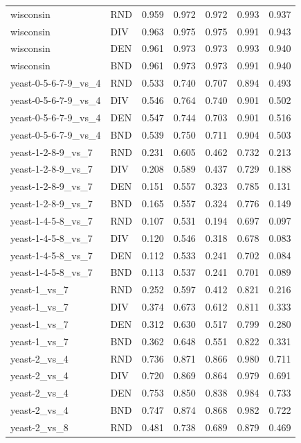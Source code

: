 \documentclass[10pt,a4paper]{article}
\begin{document}
\begin{longtable}{lllllrr}
wisconsin & RND & 0.959 & 0.972 & 0.972 & 0.993 & 0.937 \\
wisconsin & DIV & 0.963 & 0.975 & 0.975 & 0.991 & 0.943 \\
wisconsin & DEN & 0.961 & 0.973 & 0.973 & 0.993 & 0.940 \\
wisconsin & BND & 0.961 & 0.973 & 0.973 & 0.991 & 0.940 \\
yeast-0-5-6-7-9\_vs\_4 & RND & 0.533 & 0.740 & 0.707 & 0.894 & 0.493 \\
yeast-0-5-6-7-9\_vs\_4 & DIV & 0.546 & 0.764 & 0.740 & 0.901 & 0.502 \\
yeast-0-5-6-7-9\_vs\_4 & DEN & 0.547 & 0.744 & 0.703 & 0.901 & 0.516 \\
yeast-0-5-6-7-9\_vs\_4 & BND & 0.539 & 0.750 & 0.711 & 0.904 & 0.503 \\
yeast-1-2-8-9\_vs\_7 & RND & 0.231 & 0.605 & 0.462 & 0.732 & 0.213 \\
yeast-1-2-8-9\_vs\_7 & DIV & 0.208 & 0.589 & 0.437 & 0.729 & 0.188 \\
yeast-1-2-8-9\_vs\_7 & DEN & 0.151 & 0.557 & 0.323 & 0.785 & 0.131 \\
yeast-1-2-8-9\_vs\_7 & BND & 0.165 & 0.557 & 0.324 & 0.776 & 0.149 \\
yeast-1-4-5-8\_vs\_7 & RND & 0.107 & 0.531 & 0.194 & 0.697 & 0.097 \\
yeast-1-4-5-8\_vs\_7 & DIV & 0.120 & 0.546 & 0.318 & 0.678 & 0.083 \\
yeast-1-4-5-8\_vs\_7 & DEN & 0.112 & 0.533 & 0.241 & 0.702 & 0.084 \\
yeast-1-4-5-8\_vs\_7 & BND & 0.113 & 0.537 & 0.241 & 0.701 & 0.089 \\
yeast-1\_vs\_7 & RND & 0.252 & 0.597 & 0.412 & 0.821 & 0.216 \\
yeast-1\_vs\_7 & DIV & 0.374 & 0.673 & 0.612 & 0.811 & 0.333 \\
yeast-1\_vs\_7 & DEN & 0.312 & 0.630 & 0.517 & 0.799 & 0.280 \\
yeast-1\_vs\_7 & BND & 0.362 & 0.648 & 0.551 & 0.822 & 0.331 \\
yeast-2\_vs\_4 & RND & 0.736 & 0.871 & 0.866 & 0.980 & 0.711 \\
yeast-2\_vs\_4 & DIV & 0.720 & 0.869 & 0.864 & 0.979 & 0.691 \\
yeast-2\_vs\_4 & DEN & 0.753 & 0.850 & 0.838 & 0.984 & 0.733 \\
yeast-2\_vs\_4 & BND & 0.747 & 0.874 & 0.868 & 0.982 & 0.722 \\
yeast-2\_vs\_8 & RND & 0.481 & 0.738 & 0.689 & 0.879 & 0.469 \\

\end{longtable}
\end{document}
